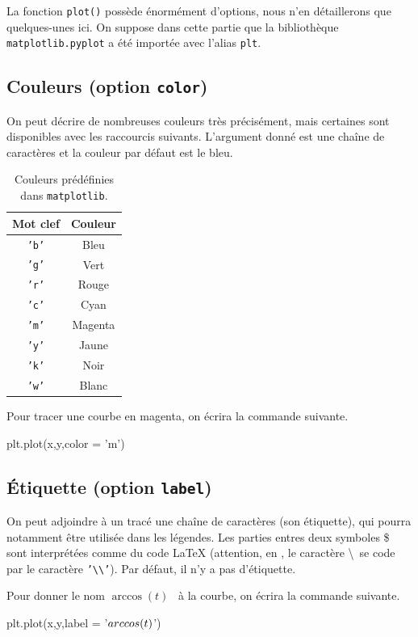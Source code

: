 La fonction \texttt{plot()} possède énormément d'options, nous n'en détaillerons que quelques-unes ici. On suppose dans 
cette partie que la bibliothèque \texttt{matplotlib.pyplot} a été importée avec l'alias \texttt{plt}.

\subsection{Couleurs (option \texttt{color})}

On peut décrire de nombreuses couleurs très précisément, mais certaines sont disponibles avec les raccourcis suivants. 
L'argument donné est une chaîne de caractères et la couleur par défaut est le bleu. 

\begin{table}[!h]
  \begin{center}
    \begin{tabular}{|c|c|}
      \hline
      Mot clef & Couleur \\
      \hline 
      \texttt{'b'} & Bleu \\
      \hline 
      \texttt{'g'} & Vert \\
      \hline 
      \texttt{'r'} & Rouge \\
      \hline 
      \texttt{'c'} & Cyan \\
      \hline 
      \texttt{'m'} & Magenta \\
      \hline 
      \texttt{'y'} & Jaune \\
      \hline 
      \texttt{'k'} & Noir \\
      \hline 
      \texttt{'w'} & Blanc \\
      \hline
    \end{tabular}
    \caption{Couleurs prédéfinies dans \texttt{matplotlib}.}
  \end{center}
\end{table}
\begin{ex}
  Pour tracer une courbe en magenta, on écrira la commande suivante.
\begin{pyverbatim}
plt.plot(x,y,color = 'm')
\end{pyverbatim}
\end{ex}

\subsection{Étiquette (option \texttt{label})}

On peut adjoindre à un tracé une chaîne de caractères (son étiquette), qui pourra notamment être utilisée dans les légendes. 
Les parties entres deux symboles \$ sont interprétées comme du code \LaTeX{} (attention, en \python, le caractère \textbackslash\ se code par le caractère \texttt{'\textbackslash\textbackslash'}). 
Par défaut, il n'y a pas d'étiquette.
\begin{ex}
  Pour donner le nom \og $\arccos(t)$ \fg\ à la courbe, on écrira la commande suivante.
\begin{pyverbatim}
plt.plot(x,y,label = '$\\arccos(t)$')
\end{pyverbatim}
\end{ex}
